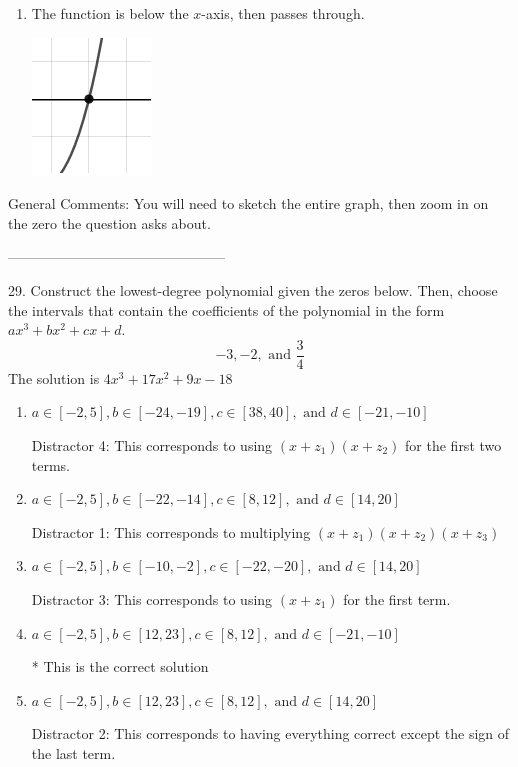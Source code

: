 \documentclass{article}[10pt]
\begin{document}
\begin{enumerate}[label=\Alph*.]
\item The function is below the $x$-axis, then passes through. 
\begin{center}\includegraphics[scale=0.5]{../Figures/zeroBehaviorPositiveOdd.png}\end{center} 
 
\end{enumerate} 
 
General Comments: You will need to sketch the entire graph, then zoom in on the zero the question asks about.

-----------------------------------------------

29. Construct the lowest-degree polynomial given the zeros below. Then, choose the intervals that contain the coefficients of the polynomial in the form $ax^3+bx^2+cx+d$.
$$ -3, -2, \text{ and } \frac{3}{4} $$ 
The solution is $ 4 x^3 + 17 x^2 + 9 x - 18 $ 

\begin{enumerate}[label=\Alph*.] 
\item $ a \in [-2, 5], b \in [-24, -19], c \in [38, 40], \text{ and } d \in [-21, -10] $ 

  Distractor 4: This corresponds to using $(x+z_1)(x+z_2)$ for the first two terms. 
\item $ a \in [-2, 5], b \in [-22, -14], c \in [8, 12], \text{ and } d \in [14, 20] $ 

  Distractor 1: This corresponds to multiplying $(x+z_1)(x+z_2)(x+z_3)$ 
\item $ a \in [-2, 5], b \in [-10, -2], c \in [-22, -20], \text{ and } d \in [14, 20] $ 

  Distractor 3: This corresponds to using $(x+z_1)$ for the first term. 
\item $ a \in [-2, 5], b \in [12, 23], c \in [8, 12], \text{ and } d \in [-21, -10] $ 

 * This is the correct solution 
\item $ a \in [-2, 5], b \in [12, 23], c \in [8, 12], \text{ and } d \in [14, 20] $ 

  Distractor 2: This corresponds to having everything correct except the sign of the last term. 
\end{enumerate} 
 
\end{document}
